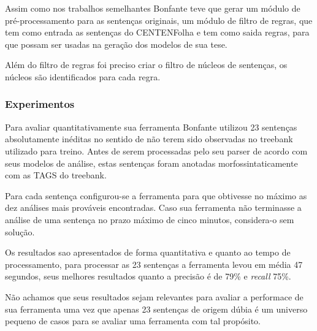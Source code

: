Assim como nos trabalhos semelhantes Bonfante teve que gerar um módulo de pré-processamento para as sentenças originais, um módulo de filtro de regras, que tem como entrada as sentenças do CENTENFolha e tem como saida regras, para que possam ser usadas na geração dos modelos de sua tese.

Além do filtro de regras foi preciso criar o filtro de núcleos de sentenças, os núcleos são identificados para cada regra. 


\subsubsection{Experimentos} %
\label{sec:bonfante_experimentos}


Para avaliar quantitativamente sua ferramenta Bonfante utilizou 23 sentenças absolutamente inéditas no sentido de não terem sido observadas no treebank utilizado para treino. Antes de serem processadas pelo seu parser de acordo com seus modelos de análise, estas sentenças foram anotadas morfossintaticamente com as TAGS do treebank.

Para cada sentença configurou-se a ferramenta para que obtivesse no máximo as dez análises mais prováveis encontradas. Caso sua ferramenta não terminasse a análise de uma sentença no prazo máximo de cinco minutos, considera-o sem solução.

Os resultados sao apresentados de forma quantitativa e quanto ao tempo de processamento, para processar as 23 sentenças a ferramenta levou em média 47 segundos, seus melhores resultados quanto a precisão é de 79{\%} e \emph{recall} 75{\%}.

Não achamos que seus resultados sejam relevantes para avaliar a performace de sua ferramenta uma vez que apenas 23 sentenças de origem dúbia é um universo pequeno de casos para se avaliar uma ferramenta com tal propósito.





